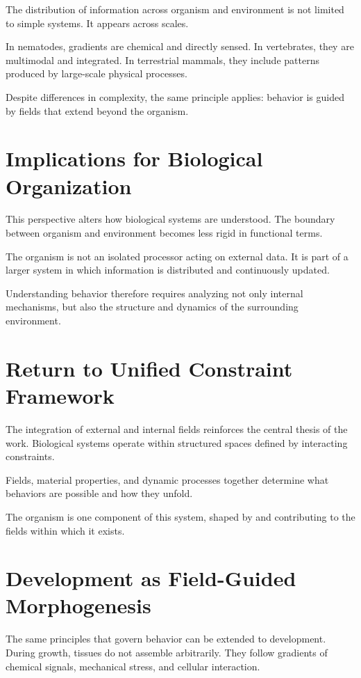 \documentclass[11pt,oneside]{book}
\begin{document}
The distribution of information across organism and environment is not limited to simple systems. It appears across scales.

In nematodes, gradients are chemical and directly sensed. In vertebrates, they are multimodal and integrated. In terrestrial mammals, they include patterns produced by large-scale physical processes.

Despite differences in complexity, the same principle applies: behavior is guided by fields that extend beyond the organism.

\section{Implications for Biological Organization}

This perspective alters how biological systems are understood. The boundary between organism and environment becomes less rigid in functional terms.

The organism is not an isolated processor acting on external data. It is part of a larger system in which information is distributed and continuously updated.

Understanding behavior therefore requires analyzing not only internal mechanisms, but also the structure and dynamics of the surrounding environment.

\section{Return to Unified Constraint Framework}

The integration of external and internal fields reinforces the central thesis of the work. Biological systems operate within structured spaces defined by interacting constraints.

Fields, material properties, and dynamic processes together determine what behaviors are possible and how they unfold.

The organism is one component of this system, shaped by and contributing to the fields within which it exists.

\section{Development as Field-Guided Morphogenesis}

The same principles that govern behavior can be extended to development. During growth, tissues do not assemble arbitrarily. They follow gradients of chemical signals, mechanical stress, and cellular interaction.
\end{document}

